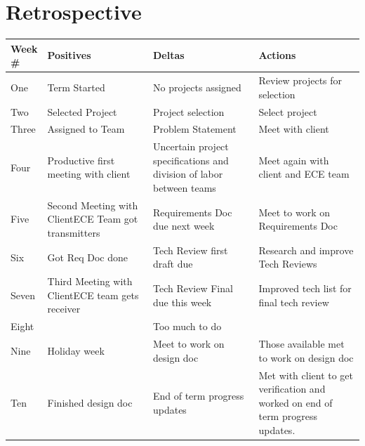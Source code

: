 \documentclass[onecolumn, draftclsnofoot,10pt, compsoc]{IEEEtran}
\begin{document}
\section{Retrospective}
    \begin{tabular}{|p{0.1\linewidth}|p{0.3\linewidth}|p{0.3\linewidth}|p{0.3\linewidth}|}
    \hline
        Week \# & Positives & Deltas & Actions \\
        \hline
        One & Term Started & No projects assigned & Review projects for selection \\
        \hline
        Two & Selected Project & Project selection & Select project \\
        \hline
        Three & Assigned to Team & Problem Statement & Meet with client  \\
        \hline
        Four & Productive first meeting with client & Uncertain project specifications and division of labor between teams & Meet again with client and ECE team \\
        \hline
        Five & Second Meeting with Client\newline ECE Team got transmitters & Requirements Doc due next week & Meet to work on Requirements Doc \\
        \hline
        Six & Got Req Doc done & Tech Review first draft due & Research and improve Tech Reviews \\
        \hline
        Seven & Third Meeting with Client\newline ECE team gets receiver & Tech Review Final due this week & Improved tech list for final tech review \\
        \hline
        Eight &  & Too much to do & \\
        \hline
        Nine & Holiday week & Meet to work on design doc & Those available met to work on design doc \\
        \hline
        Ten & Finished design doc & End of term progress updates & Met with client to get verification and worked on end of term progress updates. \\
        \hline
    \end{tabular}
\end{document}
